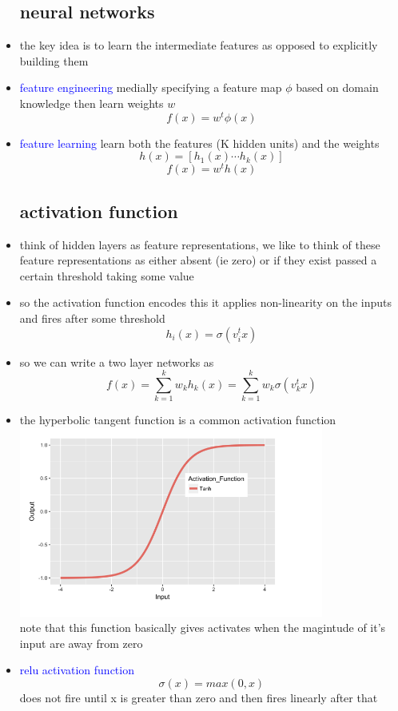 \documentclass{article}
\begin{document}
\begin{itemize}
\subsection*{neural networks}
\item the key idea is to learn the intermediate features as opposed to explicitly building them  
\item \textcolor{blue}{feature engineering} medially specifying a feature map $\phi $ based on domain knowledge then learn weights $w$ $$f(x)=w^t\phi(x)$$
\item \textcolor{blue}{feature learning } learn both the features (K hidden units) and the weights $$h(x)=[h_1(x)\cdots h_k(x)]$$ $$f(x)=w^{t}h(x)$$
\subsection*{activation function}
\item think of hidden layers as feature representations, we like to think of these feature representations as either absent (ie zero) or if they exist passed a certain threshold taking some value 
\item so the activation function encodes this it applies non-linearity on the inputs and fires after some threshold $$h_{i}(x)=\sigma(v_i^{t}x)$$
\item so we can write a two layer networks as $$f(x)=\sum_{k=1}^{k}w_{k}h_{k}(x)=\sum_{k=1}^{k}w_k\sigma(v_{k}^{t}x)$$  
\item the hyperbolic tangent function is a common activation function \\  \includegraphics*[width=10cm]{images/Screenshot 2023-05-15 at 12.25.24 AM.png}
\\ note that this function basically gives activates when the magintude of it's input are away from zero 
\item \textcolor{blue}{relu activation function} $$\sigma(x)=max(0,x)$$ does not fire until x is greater than zero and then fires linearly after that 

\end{itemize}
\end{document}
